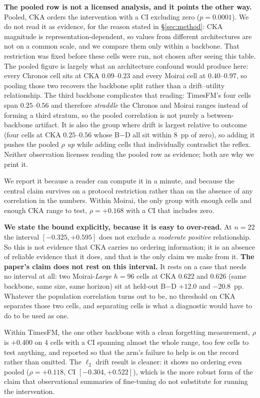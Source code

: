 \documentclass{article}
\begin{document}
\textbf{The pooled row is not a licensed analysis, and it points the other way.} Pooled, CKA
orders the intervention with a CI excluding zero ($p{=}0.0001$). We do not read it as evidence,
for the reason stated in \S\ref{sec:method}: CKA magnitude is representation-dependent, so values
from different architectures are not on a common scale, and we compare them only within a
backbone. That restriction was fixed before these cells were run, not chosen after seeing this
table. The pooled figure is largely what an architecture confound would produce here: every
Chronos cell sits at CKA $0.09$--$0.23$ and every Moirai cell at $0.40$--$0.97$, so pooling those
two recovers the backbone split rather than a drift--utility relationship. The third backbone complicates that reading: TimesFM's four cells span $0.25$--$0.56$ and therefore \emph{straddle} the
Chronos and Moirai ranges instead of forming a third stratum, so the pooled correlation is not
purely a between-backbone artifact. It is also the group where drift is largest relative to
outcome (four cells at CKA $0.25$--$0.56$ whose B$-$D all sit within $8$~pp of zero), so adding it
pushes the pooled $\rho$ \emph{up} while adding cells that individually contradict the reflex.
Neither observation licenses reading the pooled row as evidence; both are why we print it.

We report it because a reader can compute it in a minute, and because the central claim survives on
a protocol restriction rather than on the absence of any correlation in the numbers. Within Moirai, the only group with enough cells and enough CKA range to test,
$\rho{=}+0.168$ with a CI that includes zero.

\textbf{We state the bound explicitly, because it is easy to over-read.} At $n{=}22$ the interval
$[-0.325, +0.595]$ does not exclude a \emph{moderate positive} relationship. So this is not evidence
that CKA carries no ordering information; it is an absence of reliable evidence that it does, and
that is the only claim we make from it. \textbf{The paper's claim does not rest on this interval.} It
rests on a case that needs no interval at all: two Moirai-\emph{Large} $h{=}96$ cells at CKA $0.622$
and $0.626$ (same backbone, same size, same horizon) sit at held-out B$-$D ${+}12.0$ and
${-}20.8$~pp. Whatever the population correlation turns out to be, no threshold on CKA separates
those two cells, and separating cells is what a diagnostic would have to do to be used as one.

Within TimesFM, the one other backbone with a clean forgetting measurement, $\rho$ is
$+0.400$ on 4 cells with a CI spanning almost the whole range, too few cells to test anything, and
reported so that the arm's failure to help is on the record rather than omitted. The $\ell_2$ drift
result is cleaner: it shows no ordering even pooled ($\rho{=}+0.118$, CI $[-0.304, +0.522]$), which is
the more robust form of the claim that observational summaries of fine-tuning do not substitute for
running the intervention.
\end{document}
